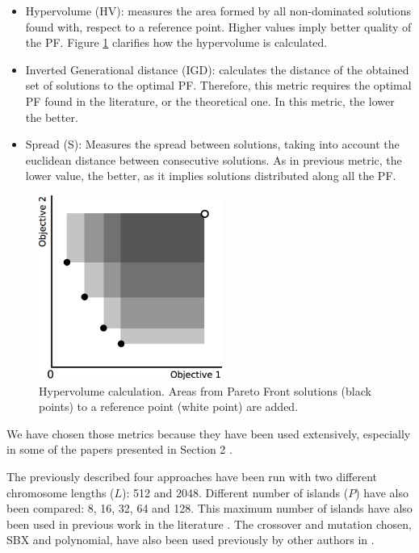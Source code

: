 \documentclass[preprint]{elsarticle}
\begin{document}
\begin{itemize}
\item Hypervolume (HV): measures the area formed by all non-dominated solutions found with, respect to a reference point. Higher values imply better quality of the PF. Figure \ref{fig:hypervolume} clarifies how the hypervolume is calculated.
\item Inverted Generational distance (IGD): calculates the distance of the obtained set of solutions to the optimal PF. Therefore, this metric requires the optimal PF found in the literature, or the theoretical one. In this metric, the lower the better. %
\item Spread (S): Measures the spread between solutions, taking into account the euclidean distance between consecutive solutions. As in previous metric, the lower value, the better, as it implies solutions distributed along all the PF.
\end{itemize}

\begin{figure}
\centering
\includegraphics[width=6cm]{hypervolume.jpg}
\caption{Hypervolume calculation. Areas from Pareto Front solutions (black points) to a reference point (white point) are added.}
\label{fig:hypervolume}
\end{figure}


We have chosen those metrics because they have been used extensively, especially in some of the papers presented in Section 2 \cite{Dorronsoro13superlinear,Durillo08masterslave,Hiroyasu07discussion,Wang09parallel,Martens13asynchronous}.



The previously described four approaches have been run with two different chromosome lengths ($L$): 512 and 2048. Different number of islands ($P$) have also been compared: 8, 16, 32, 64 and 128. This maximum number of islands have also been  used in previous work in the literature \citep{Martens13asynchronous}. The crossover and mutation chosen, SBX and polynomial, have also been  used previously by other authors in \citep{Durillo08masterslave}. 
\end{document}
